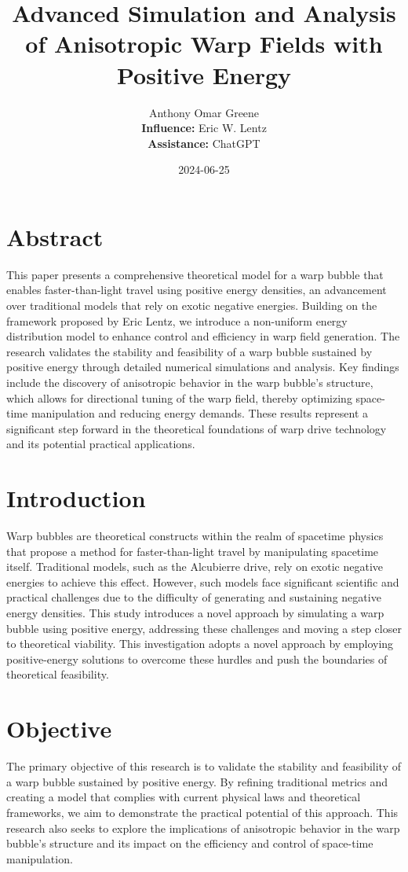 \documentclass{article}
\title{Advanced Simulation and Analysis of Anisotropic Warp Fields with Positive Energy}
\author{Anthony Omar Greene \\ \textbf{Influence:} Eric W. Lentz \\ \textbf{Assistance:} ChatGPT}
\date{2024-06-25}
\begin{document}
\maketitle

\section*{Abstract}
This paper presents a comprehensive theoretical model for a warp bubble that enables faster-than-light travel using positive energy densities, an advancement over traditional models that rely on exotic negative energies. Building on the framework proposed by Eric Lentz, we introduce a non-uniform energy distribution model to enhance control and efficiency in warp field generation. The research validates the stability and feasibility of a warp bubble sustained by positive energy through detailed numerical simulations and analysis. Key findings include the discovery of anisotropic behavior in the warp bubble's structure, which allows for directional tuning of the warp field, thereby optimizing space-time manipulation and reducing energy demands. These results represent a significant step forward in the theoretical foundations of warp drive technology and its potential practical applications.

\section*{Introduction}
Warp bubbles are theoretical constructs within the realm of spacetime physics that propose a method for faster-than-light travel by manipulating spacetime itself. Traditional models, such as the Alcubierre drive, rely on exotic negative energies to achieve this effect. However, such models face significant scientific and practical challenges due to the difficulty of generating and sustaining negative energy densities. This study introduces a novel approach by simulating a warp bubble using positive energy, addressing these challenges and moving a step closer to theoretical viability. This investigation adopts a novel approach by employing positive-energy solutions to overcome these hurdles and push the boundaries of theoretical feasibility.

\section*{Objective}
The primary objective of this research is to validate the stability and feasibility of a warp bubble sustained by positive energy. By refining traditional metrics and creating a model that complies with current physical laws and theoretical frameworks, we aim to demonstrate the practical potential of this approach. This research also seeks to explore the implications of anisotropic behavior in the warp bubble's structure and its impact on the efficiency and control of space-time manipulation.
\end{document}
